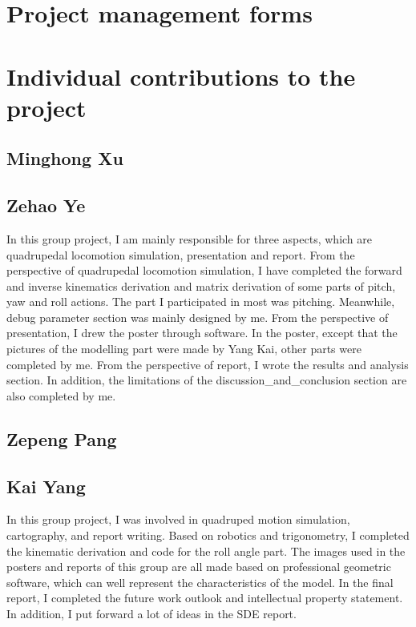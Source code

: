 \newpage
\appendix
\appendixpage
\addappheadtotoc

\chapter{Project management forms}








\chapter{Individual contributions to the project}
\section{Minghong Xu}
\section{Zehao Ye}
In this group project, I am mainly responsible for three aspects, which are quadrupedal locomotion simulation, presentation and report. From the perspective of quadrupedal locomotion simulation, I have completed the forward and inverse kinematics derivation and matrix derivation of some parts of pitch, yaw and roll actions. The part I participated in most was pitching. Meanwhile, debug parameter section was mainly designed by me. From the perspective of presentation, I drew the poster through software. In the poster, except that the pictures of the modelling part were made by Yang Kai, other parts were completed by me. From the perspective of report, I wrote the results and analysis section. In addition, the limitations of the discussion_and_conclusion section are also completed by me.

\section{Zepeng Pang}
\section{Kai Yang}
In this group project, I was involved in quadruped motion simulation, cartography, and report writing. Based on robotics and trigonometry, I completed the kinematic derivation and code for the roll angle part. The images used in the posters and reports of this group are all made based on professional geometric software, which can well represent the characteristics of the model. In the final report, I completed the future work outlook and intellectual property statement. In addition, I put forward a lot of ideas in the SDE report.